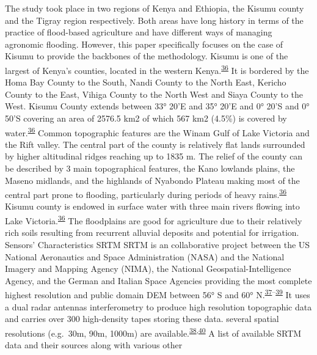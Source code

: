 \documentclass[12pt,oneside]{article}
\begin{document}
The study took place in two regions of Kenya and Ethiopia, the Kisumu
county and the Tigray region respectively. Both areas have long history
in terms of the practice of flood-based agriculture and have different
ways of managing agronomic flooding. However, this paper specifically
focuses on the case of Kisumu to provide the backbones of the
methodology. Kisumu is one of the largest of Kenya's counties, located
in the western
Kenya.\textsuperscript{\protect\hyperlink{ref-KisumuCountyGovernment_2013}{36}}
It is bordered by the Homa Bay County to the South, Nandi County to the
North East, Kericho County to the East, Vihiga County to the North West
and Siaya County to the West. Kisumu County extends between 33° 20'E and
35° 20'E and 0° 20'S and 0° 50'S covering an area of 2576.5 km2 of which
567 km2 (4.5\%) is covered by
water.\textsuperscript{\protect\hyperlink{ref-KisumuCountyGovernment_2013}{36}}
Common topographic features are the Winam Gulf of Lake Victoria and the
Rift valley. The central part of the county is relatively flat lands
surrounded by higher altitudinal ridges reaching up to 1835 m. The
relief of the county can be described by 3 main topographical features,
the Kano lowlands plains, the Maseno midlands, and the highlands of
Nyabondo Plateau making most of the central part prone to flooding,
particularly during periods of heavy
rains.\textsuperscript{\protect\hyperlink{ref-KisumuCountyGovernment_2013}{36}}
Kisumu county is endowed in surface water with three main rivers flowing
into Lake
Victoria.\textsuperscript{\protect\hyperlink{ref-KisumuCountyGovernment_2013}{36}}
The floodplains are good for agriculture due to their relatively rich
soils resulting from recurrent alluvial deposits and potential for
irrigation. Sensors' Characteristics SRTM SRTM is an collaborative
project between the US National Aeronautics and Space Administration
(NASA) and the National Imagery and Mapping Agency (NIMA), the National
Geospatial-Intelligence Agency, and the German and Italian Space
Agencies providing the most complete highest resolution and public
domain DEM between 56° S and 60°
N.\textsuperscript{\protect\hyperlink{ref-Farr_et_al_2000}{37}--\protect\hyperlink{ref-Nikolakopoulos_et_al_2006}{39}}
It uses a dual radar antennas interferometry to produce high resolution
topographic data and carries over 300 high-density tapes storing these
data. several spatial resolutions (e.g.~30m, 90m, 1000m) are
available.\textsuperscript{\protect\hyperlink{ref-Farr_et_al_2007}{38},\protect\hyperlink{ref-Jarvis_et_al_2008}{40}}
A list of available SRTM data and their sources along with various other
\end{document}
